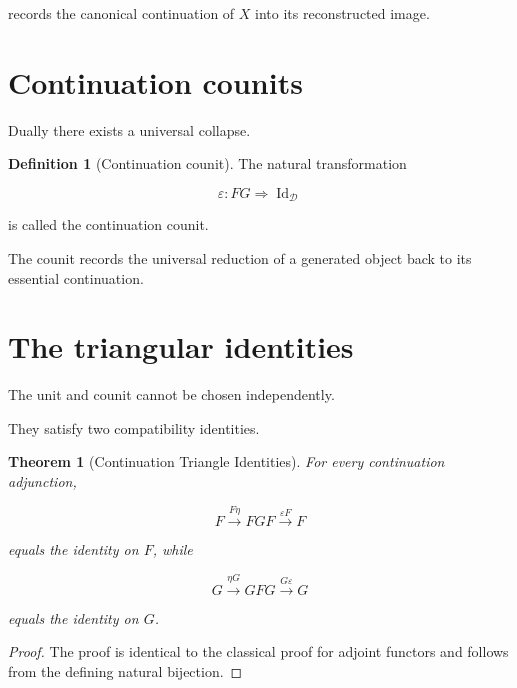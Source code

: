 \documentclass[13pt,openany]{book}
\theoremstyle{plain}
\newtheorem{theorem}{Theorem}[chapter]
\theoremstyle{definition}
\newtheorem{definition}{Definition}[chapter]
\begin{document}
records the canonical continuation of \(X\) into its reconstructed image.

\section{Continuation counits}

Dually there exists a universal collapse.

\begin{definition}[Continuation counit]
The natural transformation

\[
\varepsilon:
FG
\Longrightarrow
\operatorname{Id}_{\mathcal D}
\]

is called the continuation counit.
\end{definition}

The counit records the universal reduction of a generated object back to its
essential continuation.

\section{The triangular identities}

The unit and counit cannot be chosen independently.

They satisfy two compatibility identities.

\begin{theorem}[Continuation Triangle Identities]

For every continuation adjunction,

\[
F
\xrightarrow{F\eta}
FGF
\xrightarrow{\varepsilon F}
F
\]

equals the identity on \(F\), while

\[
G
\xrightarrow{\eta G}
GFG
\xrightarrow{G\varepsilon}
G
\]

equals the identity on \(G\).

\end{theorem}

\begin{proof}

The proof is identical to the classical proof for adjoint functors and follows
from the defining natural bijection.

\end{proof}
\end{document}
